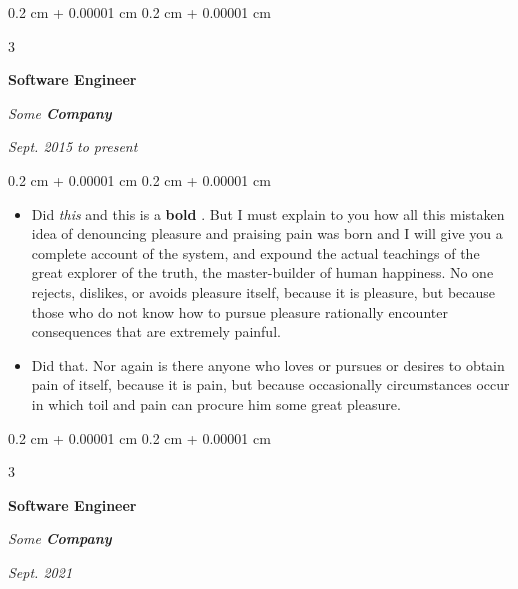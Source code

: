 \documentclass[10pt, letterpaper]{article}
\newenvironment{highlights}{
    \begin{itemize}[
        topsep=0.10 cm,
        parsep=0.10 cm,
        partopsep=0pt,
        itemsep=0pt,
        leftmargin=0.4 cm + 10pt + 0.6 cm
    ]
}{
    \end{itemize}
} %
\newenvironment{onecolentry}{
    \begin{adjustwidth}{
        0.2 cm + 0.00001 cm
    }{
        0.2 cm + 0.00001 cm
    }
}{
    \end{adjustwidth}
} %
\newenvironment{threecolentry}[3][]{
    \onecolentry
    \def\thirdColumn{#3}
    \setcolumnwidth{0.6 cm, \fill, 4.5 cm}
    \begin{paracol}{3}
    #2 \switchcolumn
}{
    \switchcolumn \raggedleft \thirdColumn
    \end{paracol}
    \endonecolentry
} %
\let\hrefWithoutArrow\href
\renewcommand{\href}[2]{\hrefWithoutArrow{#1}{\mbox{\ifthenelse{\equal{#2}{}}{ }{#2 }\raisebox{.15ex}{\footnotesize \faExternalLink*}}}}
\begin{document}
        \vspace{0.2 cm-3px}

        \begin{threecolentry}{
            \vspace*{\fill}
            \textbullet
            \vspace*{3px}
            \vspace*{\fill}
        }{
            
            
        \textit{Sept. 2015 to present}}
            \textbf{Software Engineer}
            
            \textit{Some \textbf{Company}}
        \end{threecolentry}

        \vspace{0.10 cm-3px}
        \begin{onecolentry}
            \begin{highlights}
                \item Did \textit{this} and this is a \textbf{bold} \href{https://example.com}{link}. But I must explain to you how all this mistaken idea of denouncing pleasure and praising pain was born and I will give you a complete account of the system, and expound the actual teachings of the great explorer of the truth, the master-builder of human happiness. No one rejects, dislikes, or avoids pleasure itself, because it is pleasure, but because those who do not know how to pursue pleasure rationally encounter consequences that are extremely painful.
                \item Did that. Nor again is there anyone who loves or pursues or desires to obtain pain of itself, because it is pain, but because occasionally circumstances occur in which toil and pain can procure him some great pleasure.
            \end{highlights}
        \end{onecolentry}


        \vspace{0.2 cm-3px}

        \begin{threecolentry}{
            \vspace*{\fill}
            \textbullet
            \vspace*{3px}
            \vspace*{\fill}
        }{
            
            
        \textit{Sept. 2021}}
            \textbf{Software Engineer}
            
            \textit{Some \textbf{Company}}
        \end{threecolentry}
\end{document}

